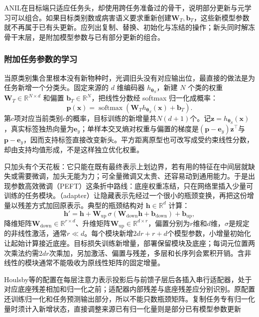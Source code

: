 ANIL在目标端只适应任务头，却使用跨任务准备过的骨干，说明部分更新与元学习可以组合。如果目标类别数或病害语义要求重新创建$\bm W_T,\bm b_T$，这些新模型参数就不再属于已有头更新。应列出复制、替换、初始化与冻结的操作；新头同时解冻骨干末层，是附加模型参数与已有部分更新的组合。

\subsubsection{附加任务参数的学习}
\label{sec:ket-transfer-added-parameters}

当原类别集合里根本没有新物种时，光调旧头没有对应输出位，最直接的做法是为任务新增一个分类头。固定来源的 $d$ 维编码器 $h_{\bm\theta_S}$，新建 $N$ 个类的权重 $\bm W_T\in\mathbb R^{N\times d}$ 和偏置 $\bm b_T\in\mathbb R^N$，把线性分数经 softmax 归一化成概率：
\begin{equation}
  \bm p(\bm x)
   =\operatorname{softmax}(\bm W_T h_{\bm{\theta}_S}(\bm x)+\bm b_T).
  \label{eq:ket-transfer-new-head}
\end{equation}
第$c$项对应当前类别$c$的概率，目标训练的新增量共$N(d+1)$个。记$\bm z=h_{\bm\theta_S}(\bm x)$，真实标签独热向量为$\bm e_y$；单样本交叉熵对权重与偏置的梯度是$(\bm p-\bm e_y)\bm z^\top$与$\bm p-\bm e_y$，因而支持标签直接改变新头。平方距离原型也可改写成受约束线性分数，却由支持均值形成，不是这样独立优化权重。

只加头有个天花板：它只能在既有最终表示上划边界，若有用的特征在中间层就缺失或需要微调，加头无能为力；可全量微调又太贵、还容易动到通用能力。于是出现参数高效微调（PEFT）这条折中路线：底座权重冻结，只在网络里插入少量可训练的任务模块。（adapter）让隐藏表示先经过一个很小的瓶颈变换，再把这份增量以残差方式加回原表示。典型的瓶颈结构对 $\bm h\in\mathbb R^d$ 计算：
\begin{equation}
  \bm h'=\bm h+
     \bm W_{\mathrm{up}}\,
       \sigma(\bm W_{\mathrm{down}}\bm h+\bm b_{\mathrm{down}})
       +\bm b_{\mathrm{up}},
  \label{eq:ket-transfer-adapter}
\end{equation}
降维矩阵$\bm W_{\mathrm{down}}\in\mathbb R^{r\times d}$、升维矩阵$\bm W_{\mathrm{up}}\in\mathbb R^{d\times r}$，偏置分别为$r$维和$d$维，$\sigma$是规定的非线性激活，通常$r\ll d$。每个模块新增$2dr+r+d$个模型参数，小增量初始化让起始计算接近底座。目标损失训练新增量，部署保留模块及底座；每词元位置两次乘法约需$2dr$次乘加，另加激活、偏置与残差，多层和长序列会累积开销。含非线性的模块通常不能吸收为原线性矩阵的固定增量。

Houlsby等的配置在每层注意力表示投影后与前馈子层后各插入串行适配器，处于对应底座残差相加和归一化之前；适配器内部残差与底座残差应分别识别。原配置还训练归一化和任务预测输出部分，所以不能只数瓶颈矩阵。复制任务专有归一化量时须计入新增状态，直接调整来源已有归一化量则是部分已有模型参数更新

